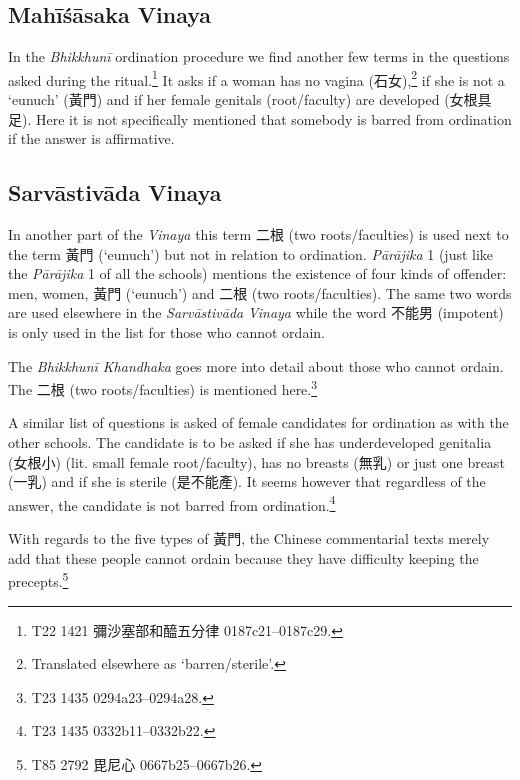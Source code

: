 \subsection{Mahīśāsaka Vinaya}
In the \textit{Bhikkhunī} ordination procedure we find another few terms in the questions asked during the ritual.\footnote{T22 1421 彌沙塞部和醯五分律 0187c21–0187c29.} It asks if a woman has no vagina (石女),\footnote{Translated elsewhere as `barren/sterile'.} if she is not a `eunuch' (黃門) and if her female genitals (root/faculty) are developed (女根具足). Here it is not specifically mentioned that somebody is barred from ordination if the answer is affirmative.

\subsection{Sarvāstivāda Vinaya}

In another part of the \textit{Vinaya} this term 二根 (two roots/faculties) is used next to the term 黃門 (`eunuch') but not in relation to ordination. \textit{Pārājika} 1 (just like the \textit{Pārājika} 1 of all the schools) mentions the existence of four kinds of offender: men, women, 黃門 (`eunuch') and 二根 (two roots/faculties). The same two words are used elsewhere in the \textit{Sarvāstivāda} \textit{Vinaya} while the word 不能男 (impotent) is only used in the list for those who cannot ordain.

The \textit{Bhikkhunī Khandhaka} goes more into detail about those who cannot ordain. The 二根 (two roots/faculties) is mentioned here.\footnote{T23 1435 0294a23–0294a28.} 

A similar list of questions is asked of female candidates for ordination as with the other schools. The candidate is to be asked if she has underdeveloped genitalia (女根小) (lit. small female root/faculty), has no breasts (無乳) or just one breast (一乳) and if she is sterile (是不能產). It seems however that regardless of the answer, the candidate is not barred from ordination.\footnote{T23 1435 0332b11–0332b22.}

With regards to the five types of 黃門, the Chinese commentarial texts merely add that these people cannot ordain because they have difficulty keeping the precepts.\footnote{T85 2792 毘尼心 0667b25–0667b26.}
